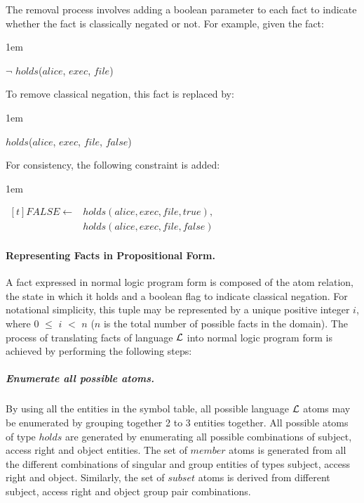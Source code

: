 \documentclass[11pt, twocolumn]{article}
\newenvironment{vquote}
  {\begin{list}{}{\leftmargin 1em}\item[]}
  {\end{list}}
\begin{document}
          The removal process involves adding a boolean parameter to each fact
          to indicate whether the fact is classically negated or not. For
          example, given the fact:

          \begin{vquote}
            $\lnot$ $holds$($alice$, $exec$, $file$)
          \end{vquote}

          To remove classical negation, this fact is replaced by:

          \begin{vquote}
            $holds$($alice$, $exec$, $file$, $false$)
          \end{vquote}

          For consistency, the following constraint is added:

          \begin{vquote}
            \begin{math}
              \begin{aligned}[t]
                FALSE \leftarrow & holds(alice, exec, file, true), \\
                & holds(alice, exec, file, false)
              \end{aligned}
            \end{math}
          \end{vquote}

        \paragraph{Representing Facts in Propositional Form.}

          A fact expressed in normal logic program form is composed of the
          atom relation, the state in which it holds and a boolean flag to
          indicate classical negation. For notational simplicity, this tuple
          may be represented by a unique positive integer $i$, where $0$ $\leq$
          $i$ $<$ $n$ ($n$ is the total number of possible facts in the
          domain). The process of translating facts of language ${\cal L}$
          into normal logic program form is achieved by performing the
          following steps:

          \subparagraph{Enumerate all possible atoms.}
            By using all the entities in the symbol table, all possible
            language ${\cal L}$ atoms may be enumerated by grouping together
            2 to 3 entities together. All possible atoms of type $holds$ are
            generated by enumerating all possible combinations of subject,
            access right and object entities. The set of $member$ atoms is
            generated from all the different combinations of singular and
            group entities of types subject, access right and object.
            Similarly, the set of $subset$ atoms is derived from different
            subject, access right and object group pair combinations.
\end{document}
